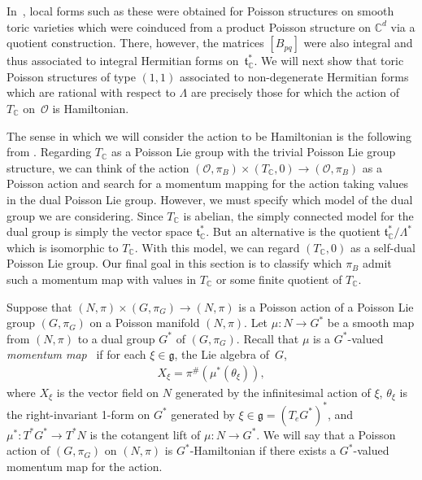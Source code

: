 \documentclass[pdftex]{sigma}
\numberwithin{equation}{section}
\begin{document}
In~\cite{Caine}, local forms such as these were obtained for Poisson structures on smooth toric varieties which were coinduced from a product Poisson structure on ${\mathbb C}^d$ via a quotient construction. There, however, the matrices $[B_{pq}]$ were also integral and thus associated to integral Hermitian forms on~${\mathfrak t}_{\mathbb C}^*$. We will next show that toric Poisson structures of type $(1,1)$ associated to non-degenerate Hermitian forms which are rational with respect to $\Lambda$ are precisely those for which the action of~$T_{\mathbb C}$ on~$\mathcal O$ is Hamiltonian.

The sense in which we will consider the action to be Hamiltonian is the following from \cite{Lu}. Regarding $T_{\mathbb C}$ as a Poisson Lie group with the trivial Poisson Lie group structure, we can think of the action $ (\mathcal O,\pi_B)\times (T_{\mathbb C},0) \to (\mathcal O,\pi_B)$ as a Poisson action and search for a momentum mapping for the action taking values in the dual Poisson Lie group. However, we must specify which model of the dual group we are considering. Since $T_{\mathbb C}$ is abelian, the simply connected model for the dual group is simply the vector space ${\mathfrak t}_{\mathbb C}^*$. But an alternative is the quotient ${\mathfrak t}_{\mathbb C}^*/\Lambda^*$ which is isomorphic to $T_{\mathbb C}$. With this model, we can regard $(T_{\mathbb C},0)$ as a self-dual Poisson Lie group. Our f\/inal goal in this section is to classify which $\pi_B$ admit such a momentum map with values in $T_{\mathbb C}$ or some f\/inite quotient of $T_{\mathbb C}$.

Suppose that $(N,\pi)\times (G,\pi_G)\to (N,\pi)$ is a Poisson action of a Poisson Lie group $(G,\pi_G)$ on a Poisson manifold $(N,\pi)$. Let $\mu\colon N\to G^*$ be a smooth map from $(N,\pi)$ to a dual group $G^*$ of $(G,\pi_G)$. Recall that $\mu$ is a $G^*$-valued \emph{momentum map}~\cite{Lu} if for each $\xi\in{\mathfrak g}$, the Lie algebra of~$G$,
\begin{gather}\label{differential condition}
X_\xi=\pi^\#(\mu^*(\theta_\xi)),
\end{gather}
where $X_\xi$ is the vector f\/ield on $N$ generated by the inf\/initesimal action of $\xi$, $\theta_\xi$ is the right-invariant 1-form on $G^*$ generated by $\xi\in {\mathfrak g}=(T_eG^*)^*$, and $\mu^*\colon T^*G^*\to T^*N$ is the cotangent lift of $\mu\colon N\to G^*$. We will say that a Poisson action of $(G,\pi_G)$ on $(N,\pi)$ is $G^*$-Hamiltonian if there exists a $G^*$-valued momentum map for the action.
\end{document}
